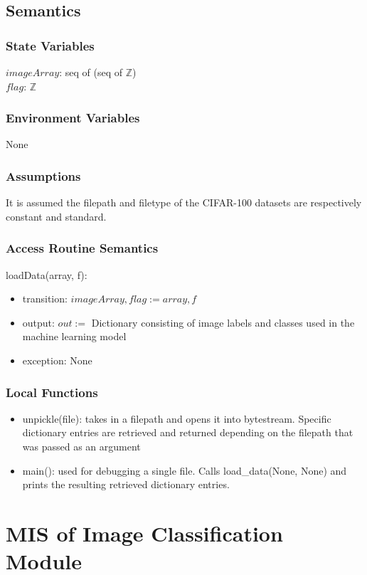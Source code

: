 \documentclass[12pt, titlepage]{article}
\begin{document}
\subsection{Semantics}
\subsubsection{State Variables}
$imageArray$: seq of (seq of $\mathbb{Z}$)\\
$flag$: $\mathbb{Z}$
\subsubsection{Environment Variables}
None
\subsubsection{Assumptions}
It is assumed the filepath and filetype of the CIFAR-100 datasets are respectively constant and standard.
\subsubsection{Access Routine Semantics}
\noindent loadData(array, f):
\begin{itemize}
	\item transition: $imageArray, flag := array, f$
	\item output: $out :=$ Dictionary consisting of image labels and classes used in the machine learning model
	\item exception: None
\end{itemize}
\subsubsection{Local Functions}
\begin{itemize}
	\item{unpickle(file): takes in a filepath and opens it into bytestream. Specific dictionary entries are retrieved and returned depending on the filepath that was passed as an argument}
	\item{main(): used for debugging a single file. Calls load\_data(None, None) and prints the resulting retrieved dictionary entries. }
\end{itemize}

\newpage

\section{MIS of Image Classification Module} \label{ImageClassification}
\end{document}
